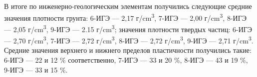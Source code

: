 
В итоге по инженерно-геологическим элементам получились следующие 
средние значения плотности грунта: 6-ИГЭ --- 2,17 г/\si{\centi\meter^3}, 
7-ИГЭ --- 2,00 г/\si{\centi\meter^3}, 8-ИГЭ --- 2,05 г/\si{\centi\meter^3}, 
9-ИГЭ --- 2.15 г/\si{\centi\meter^3}; значения плотности твердых 
частиц: 6-ИГЭ --- 2,70 г/\si{\centi\meter^3}, 7-ИГЭ --- 2,72 
г/\si{\centi\meter^3}, 8-ИГЭ --- 2,72 г/\si{\centi\meter^3}, 
9-ИГЭ --- 2,71 г/\si{\centi\meter^3}. 
Средние значения верхнего и нижнего пределов пластичности 
получились такие: 6-ИГЭ --- 22 и 12 \% соответственно, 7-ИГЭ 
--- 33 и 20 \%, 8-ИГЭ --- 43 и 19 \%, 9-ИГЭ --- 33 и 15 \%.


